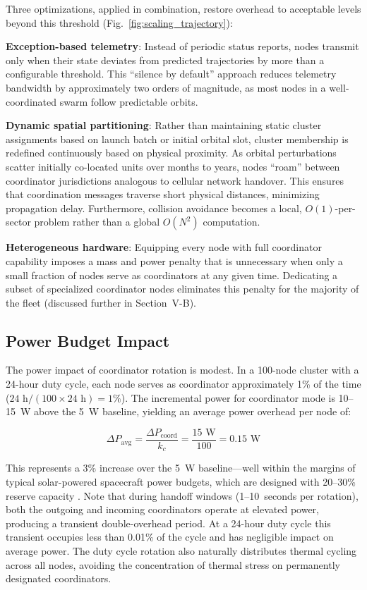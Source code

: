 \documentclass[journal]{IEEEtran}
\begin{document}
Three optimizations, applied in combination, restore overhead to acceptable levels beyond this threshold (Fig.~\ref{fig:scaling_trajectory}):

\textbf{Exception-based telemetry}: Instead of periodic status reports, nodes transmit only when their state deviates from predicted trajectories by more than a configurable threshold. This ``silence by default'' approach reduces telemetry bandwidth by approximately two orders of magnitude, as most nodes in a well-coordinated swarm follow predictable orbits.

\textbf{Dynamic spatial partitioning}: Rather than maintaining static cluster assignments based on launch batch or initial orbital slot, cluster membership is redefined continuously based on physical proximity. As orbital perturbations scatter initially co-located units over months to years, nodes ``roam'' between coordinator jurisdictions analogous to cellular network handover. This ensures that coordination messages traverse short physical distances, minimizing propagation delay. Furthermore, collision avoidance becomes a local, $O(1)$-per-sector problem rather than a global $O(N^2)$ computation.

\textbf{Heterogeneous hardware}: Equipping every node with full coordinator capability imposes a mass and power penalty that is unnecessary when only a small fraction of nodes serve as coordinators at any given time. Dedicating a subset of specialized coordinator nodes eliminates this penalty for the majority of the fleet (discussed further in Section~V-B).

\subsection{Power Budget Impact}

The power impact of coordinator rotation is modest. In a 100-node cluster with a 24-hour duty cycle, each node serves as coordinator approximately 1\% of the time ($24\text{~h} / (100 \times 24\text{~h}) = 1\%$). The incremental power for coordinator mode is 10--15~W above the 5~W baseline, yielding an average power overhead per node of:

\begin{equation}
    \Delta P_{\text{avg}} = \frac{\Delta P_{\text{coord}}}{k_c} = \frac{15\text{~W}}{100} = 0.15\text{~W}
    \label{eq:power_overhead}
\end{equation}

This represents a 3\% increase over the 5~W baseline---well within the margins of typical solar-powered spacecraft power budgets, which are designed with 20--30\% reserve capacity \cite{wertz_smad}. Note that during handoff windows (1--10~seconds per rotation), both the outgoing and incoming coordinators operate at elevated power, producing a transient double-overhead period. At a 24-hour duty cycle this transient occupies less than 0.01\% of the cycle and has negligible impact on average power. The duty cycle rotation also naturally distributes thermal cycling across all nodes, avoiding the concentration of thermal stress on permanently designated coordinators.
\end{document}
